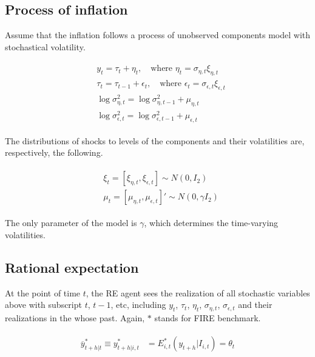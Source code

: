 \documentclass[]{article}
\begin{document}
\subsection{Process of inflation}

Assume that the inflation follows a process of unobserved components model with stochastical volatility. 

\begin{eqnarray}
\begin{split}
& y_t = \tau_t + \eta_t,\quad \textrm{where } \eta_t =\sigma_{\eta,t} \xi_{\eta,t} \\
& \tau_t = \tau_{t-1} + \epsilon_t, \quad \textrm{where }  \epsilon_t =\sigma_{\epsilon,t} \xi_{\epsilon,t} \\
& \log\sigma^2_{\eta,t} = \log\sigma^2_{\eta,t-1} + \mu_{\eta,t} \\
& \log\sigma^2_{\epsilon,t} = \log\sigma^2_{\epsilon,t-1} + \mu_{\epsilon,t} 
\end{split}
\end{eqnarray}

The distributions of shocks to levels of the components and their volatilities are, respectively, the following.

\begin{eqnarray}
\begin{split}
& \xi_t =[\xi_{\eta,t},\xi_{\epsilon,t}] \sim N(0,I_2) \\
& \mu_{t} = [\mu_{\eta,t},\mu_{\epsilon,t}]' \sim N(0,\gamma I_2) 
\end{split}
\end{eqnarray}

The only parameter of the model is $\gamma$, which determines the time-varying volatilities. 

\subsection{Rational expectation}

At the point of time $t$, the RE agent sees the realization of all stochastic variables above with subscript $t$, $t-1$, etc, including $y_t$, $\tau_t$, $\eta_t$, $\sigma_{\eta,t}$, $\sigma_{\epsilon,t}$ and their realizations in the whose past. Again, $*$ stands for FIRE benchmark. 

\begin{eqnarray}
	\begin{split}
		\overline y^*_{t+h|t} \equiv y^*_{t+h|i,t} & =  E^*_{i,t}(y_{t+h}|I_{i,t}) = \theta_t 
	\end{split}
\end{eqnarray}
\end{document}
